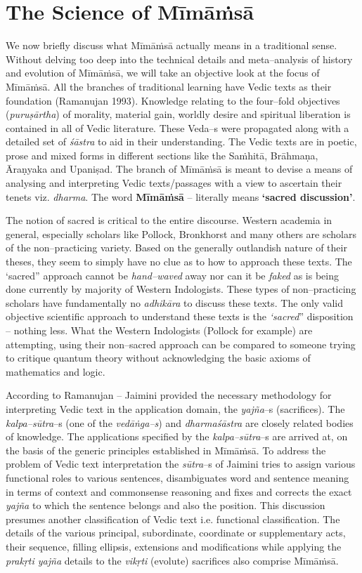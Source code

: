 \section*{The Science of Mīmāṁsā}

We now briefly discuss what Mīmāṁsā actually means in a traditional sense. Without delving too deep into the technical details and meta–analysis of history and evolution of Mīmāṁsā, we will take an objective look at the focus of Mīmāṁsā. All the branches of traditional learning have Vedic texts as their foundation (Ramanujan 1993). Knowledge relating to the four–fold objectives (\textit{puruṣārtha}) of morality, material gain, worldly desire and spiritual liberation is contained in all of Vedic literature. These Veda–s were propagated along with a detailed set of \textit{śāstra} to aid in their understanding. The Vedic texts are in poetic, prose and mixed forms in different sections like the Saṁhitā, Brāhmaṇa, Āraṇyaka and Upaniṣad. The branch of Mīmāṁsā is meant to devise a means of analysing and interpreting Vedic texts/passages with a view to ascertain their tenets viz. \textit{dharma}. The word \textbf{Mīmāṁsā} – literally means \textbf{‘sacred discussion’}.

The notion of sacred is critical to the entire discourse. Western academia in general, especially scholars like Pollock, Bronkhorst and many others are scholars of the non–practicing variety. Based on the generally outlandish nature of their theses, they seem to simply have no clue as to how to approach these texts. The ‘sacred” approach cannot be \textit{hand–waved} away nor can it be \textit{faked} as is being done currently by majority of Western Indologists. These types of non–practicing scholars have fundamentally no \textit{adhikāra} to discuss these texts. The only valid objective scientific approach to understand these texts is the \textit{‘sacred}” disposition – nothing less. What the Western Indologists (Pollock for example) are attempting, using their non–sacred approach can be compared to someone trying to critique quantum theory without acknowledging the basic axioms of mathematics and logic.

According to Ramanujan – Jaimini provided the necessary methodology for interpreting Vedic text in the application domain, the \textit{yajña}–s (sacrifices). The \textit{kalpa–sūtra}–s (one of the \textit{vedāṅga–s}) and \textit{dharmaśāstra} are closely related bodies of knowledge. The applications specified by the \textit{kalpa–sūtra}–s are arrived at, on the basis of the generic principles established in Mīmāṁsā. To address the problem of Vedic text interpretation the \textit{sūtra}–s of Jaimini tries to assign various functional roles to various sentences, disambiguates word and sentence meaning in terms of context and commonsense reasoning and fixes and corrects the exact \textit{yajña} to which the sentence belongs and also the position. This discussion presumes another classification of Vedic text i.e. functional classification. The details of the various principal, subordinate, coordinate or supplementary acts, their sequence, filling ellipsis, extensions and modifications while applying the \textit{prakṛti yajña} details to the \textit{vikṛti} (evolute) sacrifices also comprise Mīmāṁsā.

